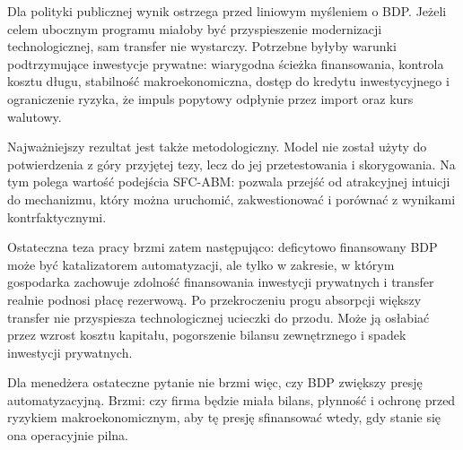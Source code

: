 Dla polityki publicznej wynik ostrzega przed liniowym myśleniem o BDP. Jeżeli celem ubocznym programu miałoby być przyspieszenie modernizacji technologicznej, sam transfer nie wystarczy. Potrzebne byłyby warunki podtrzymujące inwestycje prywatne: wiarygodna ścieżka finansowania, kontrola kosztu długu, stabilność makroekonomiczna, dostęp do kredytu inwestycyjnego i ograniczenie ryzyka, że impuls popytowy odpłynie przez import oraz kurs walutowy.

Najważniejszy rezultat jest także metodologiczny. Model nie został użyty do potwierdzenia z góry przyjętej tezy, lecz do jej przetestowania i skorygowania. Na tym polega wartość podejścia SFC-ABM: pozwala przejść od atrakcyjnej intuicji do mechanizmu, który można uruchomić, zakwestionować i porównać z wynikami kontrfaktycznymi.

Ostateczna teza pracy brzmi zatem następująco: deficytowo finansowany BDP może być katalizatorem automatyzacji, ale tylko w zakresie, w którym gospodarka zachowuje zdolność finansowania inwestycji prywatnych i transfer realnie podnosi płacę rezerwową. Po przekroczeniu progu absorpcji większy transfer nie przyspiesza technologicznej ucieczki do przodu. Może ją osłabiać przez wzrost kosztu kapitału, pogorszenie bilansu zewnętrznego i spadek inwestycji prywatnych.

Dla menedżera ostateczne pytanie nie brzmi więc, czy BDP zwiększy presję automatyzacyjną. Brzmi: czy firma będzie miała bilans, płynność i ochronę przed ryzykiem makroekonomicznym, aby tę presję sfinansować wtedy, gdy stanie się ona operacyjnie pilna.
